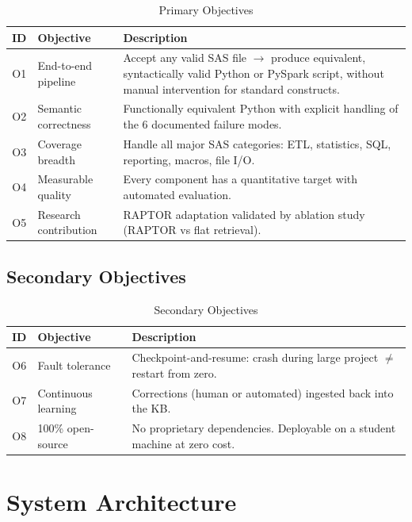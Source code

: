 \documentclass[11pt,a4paper]{article}
\begin{document}
\begin{table}[H]
\centering
\caption{Primary Objectives}
\renewcommand{\arraystretch}{1.3}
\begin{tabularx}{\textwidth}{@{} c L{3cm} X @{}}
\toprule
\textbf{ID} & \textbf{Objective} & \textbf{Description} \\
\midrule
O1 & End-to-end pipeline & Accept any valid SAS file $\to$ produce equivalent, syntactically valid Python or PySpark script, without manual intervention for standard constructs. \\
O2 & Semantic correctness & Functionally equivalent Python with explicit handling of the 6 documented failure modes. \\
O3 & Coverage breadth & Handle all major SAS categories: ETL, statistics, SQL, reporting, macros, file I/O. \\
O4 & Measurable quality & Every component has a quantitative target with automated evaluation. \\
O5 & Research contribution & RAPTOR adaptation validated by ablation study (RAPTOR vs flat retrieval). \\
\bottomrule
\end{tabularx}
\end{table}

\subsection{Secondary Objectives}

\begin{table}[H]
\centering
\caption{Secondary Objectives}
\renewcommand{\arraystretch}{1.3}
\begin{tabularx}{\textwidth}{@{} c L{3.5cm} X @{}}
\toprule
\textbf{ID} & \textbf{Objective} & \textbf{Description} \\
\midrule
O6 & Fault tolerance & Checkpoint-and-resume: crash during large project $\neq$ restart from zero. \\
O7 & Continuous learning & Corrections (human or automated) ingested back into the KB. \\
O8 & 100\% open-source & No proprietary dependencies. Deployable on a student machine at zero cost. \\
\bottomrule
\end{tabularx}
\end{table}


\section{System Architecture}
\end{document}
